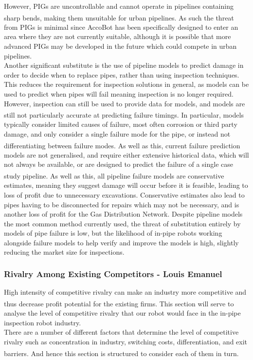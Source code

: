 \documentclass[11pt]{article}		%
\newcommand{\supercite}[1]{\textsuperscript{\cite{#1}}}		%
\begin{document}
				However, PIGs are uncontrollable and cannot operate in pipelines containing sharp bends\supercite{mills2017advances}, making them unsuitable for urban pipelines.
				As such the threat from PIGs is minimal since AccoBot has been specifically designed to enter an area where they are not currently suitable, although it is possible that more advanced PIGs may be developed in the future which could compete in urban pipelines.
				\\
				Another significant substitute is the use of pipeline models to predict damage in order to decide when to replace pipes, rather than using inspection techniques.
				This reduces the requirement for inspection solutions in general, as models can be used to predict when pipes will fail meaning inspection is no longer required.
				However, inspection can still be used to provide data for models, and models are still not particularly accurate at predicting failure timings\supercite{zakikhani2020review}.
				In particular, models typically consider limited causes of failure, most often corrosion or third party damage, and only consider a single failure mode for the pipe, or instead not differentiating between failure modes\supercite{zakikhani2020review}.
				As well as this, current failure prediction models are not generalised, and require either extensive historical data, which will not always be available, or are designed to predict the failure of a single case study pipeline\supercite{zakikhani2020review}.
				As well as this, all pipeline failure models are conservative estimates, meaning they suggest damage will occur before it is feasible, leading to loss of profit due to unnecessary excavations.
				Conservative estimates also lead to pipes having to be disconnected for repairs which may not be necessary, and is another loss of profit for the Gas Distribution Network.
				Despite pipeline models the most common method currently used, the threat of substitution entirely by models of pipe failure is low, but the likelihood of in-pipe robots working alongside failure models to help verify and improve the models is high, slightly reducing the market size for inspections.
			
			\subsubsection{Rivalry Among Existing Competitors - Louis Emanuel}
				High intensity of competitive rivalry can make an industry more competitive and thus decrease profit potential for the existing firms\supercite{porter2008five}. This section will serve to analyse the level of competitive rivalry that our robot would face in the in-pipe inspection robot industry. \\
		        \hspace*{3ex}There are a number of different factors that determine the level of competitive rivalry such as concentration in industry, switching costs, differentiation, and exit barriers\supercite{rivalryfactorsCI}. And hence this section is structured to consider each of them in turn. 
		        
\end{document}
